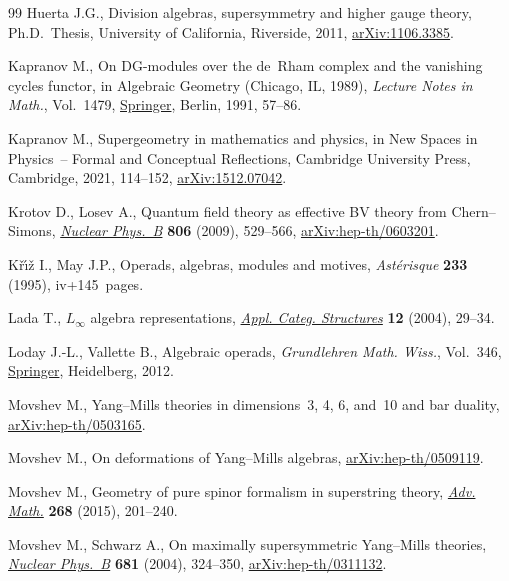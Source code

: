 \documentclass[10pt,a4paper]{amsart}
\numberwithin{equation}{section}
\begin{document}
\begin{thebibliography}{99}
Huerta J.G., Division algebras, supersymmetry and higher gauge theory, Ph.D.~Thesis, {U}niversity of California, Riverside, 2011, \href{https://arxiv.org/abs/1106.3385}{arXiv:1106.3385}.

Kapranov M., On {DG}-modules over the de~{R}ham complex and the vanishing
 cycles functor, in Algebraic {G}eometry ({C}hicago, {IL}, 1989),
 \textit{Lecture Notes in Math.}, Vol.~1479, \href{https://doi.org/10.1007/BFb0086264}{Springer}, Berlin, 1991, 57--86.

Kapranov M., Supergeometry in mathematics and physics, in New Spaces in
 Physics~-- Formal and Conceptual Reflections, Cambridge University Press,
 Cambridge, 2021, 114--152, \href{https://arxiv.org/abs/1512.07042}{arXiv:1512.07042}.

Krotov D., Losev A., Quantum field theory as effective {BV} theory from
 {C}hern--{S}imons, \href{https://doi.org/10.1016/j.nuclphysb.2008.07.021}{\textit{Nuclear Phys.~B}} \textbf{806} (2009), 529--566,
 \href{https://arxiv.org/abs/hep-th/0603201}{arXiv:hep-th/0603201}.

K\v{r}\'{\i}\v{z} I., May J.P., Operads, algebras, modules and motives,
 \textit{Ast\'erisque} \textbf{233} (1995), iv+145~pages.

Lada T., {$L_\infty$} algebra representations, \href{https://doi.org/10.1023/B:APCS.0000013809.71153.30}{\textit{Appl. Categ. Structures}}
 \textbf{12} (2004), 29--34.

Loday J.-L., Vallette B., Algebraic operads, \textit{Grundlehren Math. Wiss.},
 Vol.~346, \href{https://doi.org/10.1007/978-3-642-30362-3}{Springer}, Heidelberg, 2012.

Movshev M., {Y}ang--{M}ills theories in dimensions~3, 4, 6, and~10 and bar
 duality, \href{https://arxiv.org/abs/hep-th/0503165}{arXiv:hep-th/0503165}.

Movshev M., On deformations of {Y}ang--{M}ills algebras,
 \href{https://arxiv.org/abs/hep-th/0509119}{arXiv:hep-th/0509119}.

Movshev M., Geometry of pure spinor formalism in superstring theory,
 \href{https://doi.org/10.1016/j.aim.2014.09.014}{\textit{Adv. Math.}} \textbf{268} (2015), 201--240.

Movshev M., Schwarz A., On maximally supersymmetric {Y}ang--{M}ills theories,
 \href{https://doi.org/10.1016/j.nuclphysb.2003.12.033}{\textit{Nuclear Phys.~B}} \textbf{681} (2004), 324--350,
 \href{https://arxiv.org/abs/hep-th/0311132}{arXiv:hep-th/0311132}.


\end{thebibliography}
\end{document}

